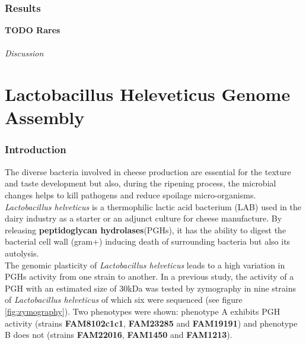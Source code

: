 \documentclass[10pt,a4paper]{article}
\begin{document}
\section*{Results} \textbf{TODO Rares}

\paragraph{Discussion}









\newpage
\part*{Lactobacillus Heleveticus Genome Assembly}
\section*{Introduction}




The diverse bacteria involved in cheese production are essential for the texture and taste development but also, during the ripening process, the microbial changes helps to kill pathogens and reduce spoilage micro-organisms. \textit{Lactobacillus helveticus} is a thermophilic lactic acid bacterium (LAB) used in the dairy industry as a starter or an adjunct culture for cheese manufacture\cite{jebava_nine_2011}. By releasing \textbf{peptidoglycan hydrolases}(PGHs), it has the ability to digest the bacterial cell wall (gram+) inducing death of surrounding bacteria but also its autolysis. \\

The genomic plasticity of \textit{Lactobacillus helveticus} leads to a high variation in PGHs activity from one strain to another. In a previous study, the activity of a PGH with an estimated size of 30kDa was tested by zymography in nine strains of \textit{Lactobacillus helveticus} of which six were sequenced (see figure \ref{fig:zymography}). Two phenotypes were shown: phenotype A exhibits PGH activity (strains \textbf{FAM8102c1c1}, \textbf{FAM23285} and \textbf{FAM19191}) and phenotype B does not (strains \textbf{FAM22016}, \textbf{FAM1450} and \textbf{FAM1213}).\\
\end{document}
